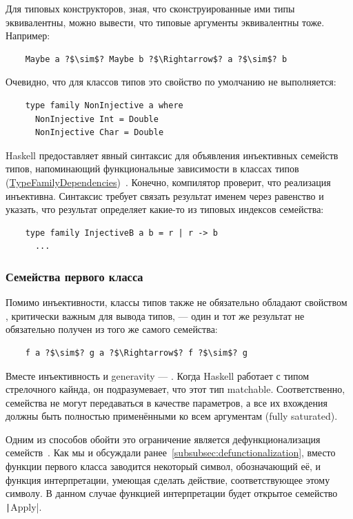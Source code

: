 Для типовых конструкторов, зная, что сконструированные ими типы эквивалентны, можно вывести, что типовые аргументы эквивалентны тоже.
Например:
\begin{verbatim}
    Maybe a ?$\sim$? Maybe b ?$\Rightarrow$? a ?$\sim$? b
\end{verbatim}

Очевидно, что для классов типов это свойство по умолчанию не выполняется:
\begin{verbatim}
    type family NonInjective a where
      NonInjective Int = Double
      NonInjective Char = Double
\end{verbatim}

Haskell предоставляет явный синтаксис для объявления инъективных семейств типов, напоминающий функциональные зависимости в классах типов (\href{https://ghc.gitlab.haskell.org/ghc/doc/users_guide/exts/type_families.html#extension-TypeFamilyDependencies}{TypeFamilyDependencies})~\cite{stolarek2015injective}.
Конечно, компилятор проверит, что реализация инъективна.
Синтаксис требует связать результат именем через равенство и указать, что результат определяет какие-то из типовых индексов семейства:
\begin{verbatim}
    type family InjectiveB a b = r | r -> b
      ...
\end{verbatim}

\subsubsection{Семейства первого класса}

Помимо инъективности, классы типов также не обязательно обладают свойством , критически важным для вывода типов, --- один и тот же результат не обязательно получен из того же самого семейства:
\begin{verbatim}
    f a ?$\sim$? g a ?$\Rightarrow$? f ?$\sim$? g
\end{verbatim}

Вместе инъективность и generavity --- .
Когда Haskell работает с типом стрелочного кайнда, он подразумевает, что этот тип matchable.
Соответственно, семейства не могут передаваться в качестве параметров, а все их вхождения должны быть полностью применёнными ко всем аргументам (fully saturated).

Одним из способов обойти это ограничение является дефункционализация семейств~\cite{defunctionalization-slides, eisenberg2014promoting}.
Как мы и обсуждали ранее~\ref{subsubsec:defunctionalization}, вместо функции первого класса заводится некоторый символ, обозначающий её, и функция интерпретации, умеющая сделать действие, соответствующее этому символу.
В данном случае функцией интерпретации будет открытое семейство \texttt|Apply|.

